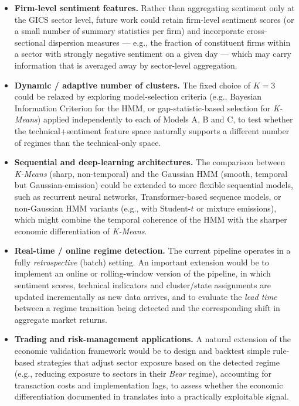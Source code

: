 \begin{itemize}
  \item \textbf{Firm-level sentiment features.} Rather than aggregating
  sentiment only at the GICS sector level, future work could retain
  firm-level sentiment scores (or a small number of summary statistics per
  firm) and incorporate cross-sectional dispersion measures --- e.g., the
  fraction of constituent firms within a sector with strongly negative
  sentiment on a given day --- which may carry information that is averaged
  away by sector-level aggregation.

  \item \textbf{Dynamic / adaptive number of clusters.} The fixed choice of
  $K=3$ could be relaxed by exploring model-selection criteria (e.g.,
  Bayesian Information Criterion for the HMM, or gap-statistic-based
  selection for \textit{K-Means}) applied independently to each of Models
  A, B and C, to test whether the technical+sentiment feature space
  naturally supports a different number of regimes than the technical-only
  space.

  \item \textbf{Sequential and deep-learning architectures.} The
  comparison between \textit{K-Means} (sharp, non-temporal) and the
  Gaussian HMM (smooth, temporal but Gaussian-emission) could be extended
  to more flexible sequential models, such as recurrent neural networks,
  Transformer-based sequence models, or non-Gaussian HMM variants (e.g.,
  with Student-$t$ or mixture emissions), which might combine the temporal
  coherence of the HMM with the sharper economic differentiation of
  \textit{K-Means}.

  \item \textbf{Real-time / online regime detection.} The current pipeline
  operates in a fully \emph{retrospective} (batch) setting. An important
  extension would be to implement an online or rolling-window version of
  the pipeline, in which sentiment scores, technical indicators and
  cluster/state assignments are updated incrementally as new data arrives,
  and to evaluate the \emph{lead time} between a regime transition being
  detected and the corresponding shift in aggregate market returns.

  \item \textbf{Trading and risk-management applications.} A natural
  extension of the economic validation framework would be to design and
  backtest simple rule-based strategies that adjust sector exposure based
  on the detected regime (e.g., reducing exposure to sectors in their
  \emph{Bear} regime), accounting for transaction costs and
  implementation lags, to assess whether the economic differentiation
  documented in  translates into a practically
  exploitable signal.


\end{itemize}
